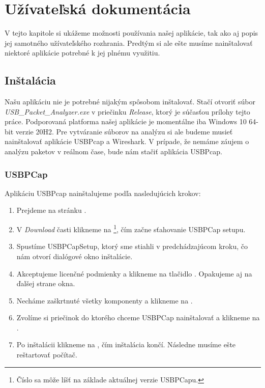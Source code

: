 \chapter{Užívateľská dokumentácia}
\label{udok:chap}

V tejto kapitole si ukážeme možnosti používania našej aplikácie, tak ako aj popis jej samotného užívateľského rozhrania. Predtým si ale ešte musíme nainštalovať niektoré aplikácie potrebné k jej plnému využitiu.

\section{Inštalácia}
Našu aplikáciu nie je potrebné nijakým spôsobom inštalovať. Stačí otvoriť súbor \textit{USB\_Packet\_Analyzer.exe} v priečinku \textit{Release}, ktorý je súčasťou prílohy tejto práce. Podporovaná platforma našej aplikácie je momentálne iba Windows 10 64-bit verzie 20H2. Pre vytváranie súborov na analýzu si ale budeme musieť nainštalovať aplikácie USBPcap a Wireshark. V prípade, že nemáme záujem o analýzu paketov v reálnom čase, bude nám stačiť aplikácia USBPcap.

\subsection{USBPCap}
Aplikáciu USBPcap nainštalujeme podľa nasledujúcich krokov:
\begin{enumerate}
\item Prejdeme na stránku .
\item V \textit{Download} časti klikneme na \footnote{Číslo sa môže líšť na základe aktuálnej verzie USBPCapu.}, čím začne sťahovanie USBPCap setupu.
\item Spustíme USBPCapSetup, ktorý sme stiahli v predchádzajúcom kroku, čo nám otvorí dialógové okno inštalácie.
\item Akceptujeme licenčné podmienky a klikneme na tlačidlo . Opakujeme aj na ďalšej strane okna.
\item Necháme zaškrtnuté všetky komponenty a klikneme na .
\item Zvolíme si priečinok do ktorého chceme USBPCap nainštalovať a klikneme na .
\item Po inštalácii klikneme na , čím inštalácia končí. Následne musíme ešte reštartovať počítač.
\end{enumerate}

